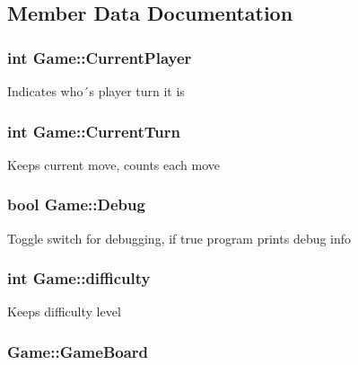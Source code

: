 \subsection{Member Data Documentation}
\hypertarget{class_game_a661282d67a0e4a972293c98478bc02e4}{
\subsubsection[{Current\-Player}]{\setlength{\rightskip}{0pt plus 5cm}int Game\-::\-Current\-Player\hspace{0.3cm}{\ttfamily [protected]}}}\label{class_game_a661282d67a0e4a972293c98478bc02e4}
Indicates who´s player turn it is \hypertarget{class_game_a88700a4643e08b12130ba2950c54ed8b}{
\subsubsection[{Current\-Turn}]{\setlength{\rightskip}{0pt plus 5cm}int Game\-::\-Current\-Turn\hspace{0.3cm}{\ttfamily [protected]}}}\label{class_game_a88700a4643e08b12130ba2950c54ed8b}
Keeps current move, counts each move \hypertarget{class_game_ad79740c2d2fa299cf322bf6ea322d9aa}{
\subsubsection[{Debug}]{\setlength{\rightskip}{0pt plus 5cm}bool Game\-::\-Debug}}\label{class_game_ad79740c2d2fa299cf322bf6ea322d9aa}
Toggle switch for debugging, if true program prints debug info \hypertarget{class_game_a536a6390d16f05d402928bd731e06ef3}{
\subsubsection[{difficulty}]{\setlength{\rightskip}{0pt plus 5cm}int Game\-::difficulty\hspace{0.3cm}{\ttfamily [protected]}}}\label{class_game_a536a6390d16f05d402928bd731e06ef3}
Keeps difficulty level \hypertarget{class_game_aeb67bc4fc06221330cfd7c862c85b66d}{
\subsubsection[{Game\-Board}]{ Game\-::\-Game\-Board}}\label{class_game_aeb67bc4fc06221330cfd7c862c85b66d}
